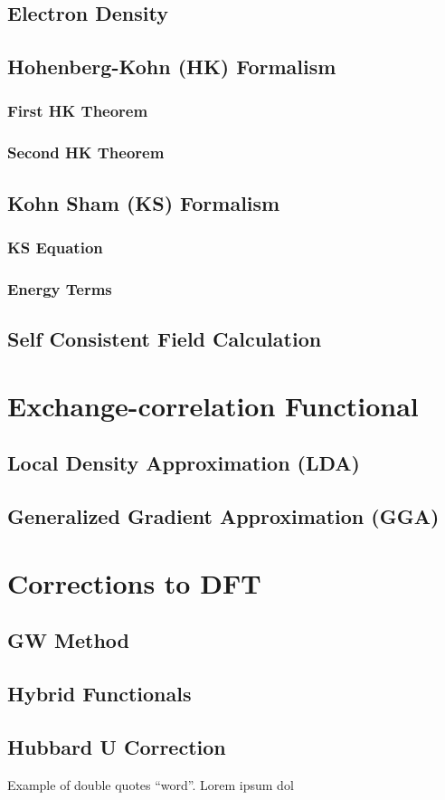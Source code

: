     \subsection{Electron Density}
    \subsection{Hohenberg-Kohn (HK) Formalism}
    \subsubsection{First HK Theorem}
        \subsubsection{Second HK Theorem}
    \subsection{Kohn Sham (KS) Formalism}
        \subsubsection{KS Equation}
        \subsubsection{Energy Terms}
    \subsection{Self Consistent Field Calculation}
\section{Exchange-correlation Functional}
    \subsection{Local Density Approximation (LDA)}
    \subsection{Generalized Gradient Approximation (GGA)}

\section{Corrections to DFT}
    \subsection{GW Method}
    \subsection{Hybrid Functionals}
    \subsection{Hubbard U Correction}

Example of double quotes ``word''. Lorem ipsum dol